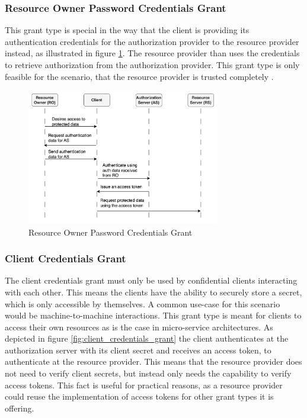 \documentclass[
    fontsize=12pt,
    headings=small,
    parskip=half,           %
    bibliography=totoc,
    numbers=noenddot,       %
    open=any,               %
    ]{scrreprt}
\begin{document}
\subsubsection{Resource Owner Password Credentials Grant}
This grant type is special in the way that the client is providing its
authentication credentials for the authorization provider to the resource
provider instead, as illustrated in figure \ref{fig:resource_owner_password_credentials_grant}. The resource provider than uses the credentials to retrieve
authorization from the authorization provider. This grant type is only feasible
for the scenario, that the resource provider is trusted completely \cite[Sec.
4.3.]{hardt2012rfc}.

\begin{figure}[ht]
	\sffamily\footnotesize
	\includegraphics[width=0.75\textwidth]{pic/resource_owner_password_credentials_grant.png}
	\unitlength=0.75mm
	\linethickness{0.4pt}
	\caption{Resource Owner Password Credentials Grant}
	\label{fig:resource_owner_password_credentials_grant}
\end{figure}
	

\subsubsection{Client Credentials Grant}
The client credentials grant must only be used by confidential clients
interacting with each other. This means the clients have the ability to
securely store a secret, which is only accessible by themselves. A common
use-case for this scenario would be machine-to-machine interactions. This grant type is meant for clients to access their own resources as is the case in micro-service architectures. As depicted in figure \ref{fig:client_credentials_grant} the client authenticates at the authorization
server with its client secret and receives an access token, to authenticate at the resource provider. This means that the resource provider does not need to verify client secrets, but instead only needs the capability to verify access tokens. This fact is useful for practical reasons, as a resource provider could reuse the implementation of access tokens for other grant types it is offering.
\cite[Sec. 4.4.]{hardt2012rfc}
\end{document}
